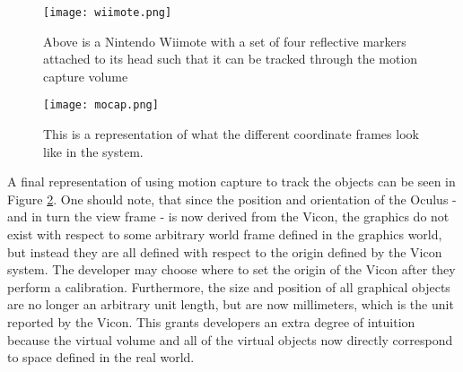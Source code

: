\begin{figure}[]
\centering
\texttt{[image: wiimote.png]}
\caption{Above is a Nintendo Wiimote with a set of four reflective markers
attached to its head such that it can be tracked through the motion capture
volume}
\label{fig:wiimote}
\end{figure}

\begin{figure}[]
\centering
\texttt{[image: mocap.png]}
\caption{This is a representation of what the different coordinate frames
look like in the system.}
\label{fig:mocap}
\end{figure}

A final representation of using motion capture to track the objects can be seen
in Figure \ref{fig:mocap}. One should note, that since the position and
orientation of the Oculus - and in turn the view frame - is now derived from
the Vicon, the graphics do not exist with respect to some arbitrary world frame
defined in the graphics world, but instead they are all defined with respect to
the origin defined by the Vicon system. The developer may choose where to set
the origin of the Vicon after they perform a calibration. Furthermore, the size
and position of all graphical objects are no longer an arbitrary unit length,
but are now millimeters, which is the unit reported by the Vicon. This grants
developers an extra degree of intuition because the virtual volume and all of
the virtual objects now directly correspond to space defined in the real world.

